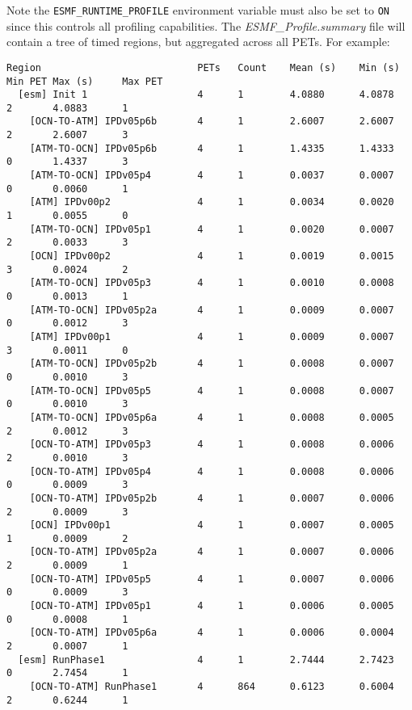 Note the {\tt ESMF\_RUNTIME\_PROFILE} environment variable must
also be set to {\tt ON} since this controls all profiling capabilities.
The {\em ESMF\_Profile.summary} file will contain a tree of
timed regions, but aggregated across all PETs. For example:

\begin{verbatim}
Region                           PETs   Count    Mean (s)    Min (s)     Min PET Max (s)     Max PET
  [esm] Init 1                   4      1        4.0880      4.0878      2       4.0883      1
    [OCN-TO-ATM] IPDv05p6b       4      1        2.6007      2.6007      2       2.6007      3
    [ATM-TO-OCN] IPDv05p6b       4      1        1.4335      1.4333      0       1.4337      3
    [ATM-TO-OCN] IPDv05p4        4      1        0.0037      0.0007      0       0.0060      1
    [ATM] IPDv00p2               4      1        0.0034      0.0020      1       0.0055      0
    [ATM-TO-OCN] IPDv05p1        4      1        0.0020      0.0007      2       0.0033      3
    [OCN] IPDv00p2               4      1        0.0019      0.0015      3       0.0024      2
    [ATM-TO-OCN] IPDv05p3        4      1        0.0010      0.0008      0       0.0013      1
    [ATM-TO-OCN] IPDv05p2a       4      1        0.0009      0.0007      0       0.0012      3
    [ATM] IPDv00p1               4      1        0.0009      0.0007      3       0.0011      0
    [ATM-TO-OCN] IPDv05p2b       4      1        0.0008      0.0007      0       0.0010      3
    [ATM-TO-OCN] IPDv05p5        4      1        0.0008      0.0007      0       0.0010      3
    [ATM-TO-OCN] IPDv05p6a       4      1        0.0008      0.0005      2       0.0012      3
    [OCN-TO-ATM] IPDv05p3        4      1        0.0008      0.0006      2       0.0010      3
    [OCN-TO-ATM] IPDv05p4        4      1        0.0008      0.0006      0       0.0009      3
    [OCN-TO-ATM] IPDv05p2b       4      1        0.0007      0.0006      2       0.0009      3
    [OCN] IPDv00p1               4      1        0.0007      0.0005      1       0.0009      2
    [OCN-TO-ATM] IPDv05p2a       4      1        0.0007      0.0006      2       0.0009      1
    [OCN-TO-ATM] IPDv05p5        4      1        0.0007      0.0006      0       0.0009      3
    [OCN-TO-ATM] IPDv05p1        4      1        0.0006      0.0005      0       0.0008      1
    [OCN-TO-ATM] IPDv05p6a       4      1        0.0006      0.0004      2       0.0007      1
  [esm] RunPhase1                4      1        2.7444      2.7423      0       2.7454      1
    [OCN-TO-ATM] RunPhase1       4      864      0.6123      0.6004      2       0.6244      1

\end{verbatim}
